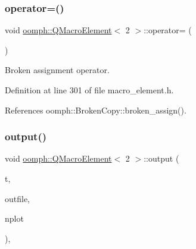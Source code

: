 \mbox{\label{classoomph_1_1QMacroElement_3_012_01_4_a641551a6b40ff5b364eb10da19af8edf}} 
\subsubsection{\texorpdfstring{operator=()}{operator=()}}
{\footnotesize\ttfamily void \hyperlink{classoomph_1_1QMacroElement}{oomph\+::\+Q\+Macro\+Element}$<$ 2 $>$\+::operator= (\begin{DoxyParamCaption}\item[{const \hyperlink{classoomph_1_1QMacroElement}{Q\+Macro\+Element}$<$ 2 $>$ \&}]{ }\end{DoxyParamCaption})\hspace{0.3cm}{\ttfamily [inline]}}



Broken assignment operator. 



Definition at line 301 of file macro\+\_\+element.\+h.



References oomph\+::\+Broken\+Copy\+::broken\+\_\+assign().

\mbox{\label{classoomph_1_1QMacroElement_3_012_01_4_a1fe56200453a2200e5103d3fb4793e38}} 
\subsubsection{\texorpdfstring{output()}{output()}}
{\footnotesize\ttfamily void \hyperlink{classoomph_1_1QMacroElement}{oomph\+::\+Q\+Macro\+Element}$<$ 2 $>$\+::output (\begin{DoxyParamCaption}\item[{const unsigned \&}]{t,  }\item[{std\+::ostream \&}]{outfile,  }\item[{const unsigned \&}]{nplot }\end{DoxyParamCaption})\hspace{0.3cm}{\ttfamily [inline]}, {\ttfamily [virtual]}}



